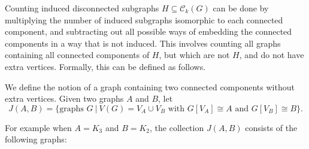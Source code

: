 \documentclass[12pt,reqno,dvipsnames]{amsart}
\theoremstyle{definition}
\begin{document}
Counting induced disconnected subgraphs $H\subseteq \mathcal{C}_k(G)$ can be done by multiplying the number of induced subgraphs isomorphic to each connected component, and subtracting out all possible ways of embedding the connected components in a way that is not induced. This involves counting all graphs containing all connected components of $H$, but which are not $H$, and do not have extra vertices. Formally, this can be defined as follows.

We define the notion of a graph containing two connected components without extra vertices. Given two graphs $A$ and $B$, let
$$
J(A, B) = \{\text{graphs } G  \ | \ 
 V(G)=V_A\cup V_B \text{ with } G[V_A]\cong A \text{ and } G[V_B]\cong B \}.
$$

For example when $A=K_3$ and $B=K_2$, the collection $J(A,B)$ consists of the following graphs:
\end{document}
